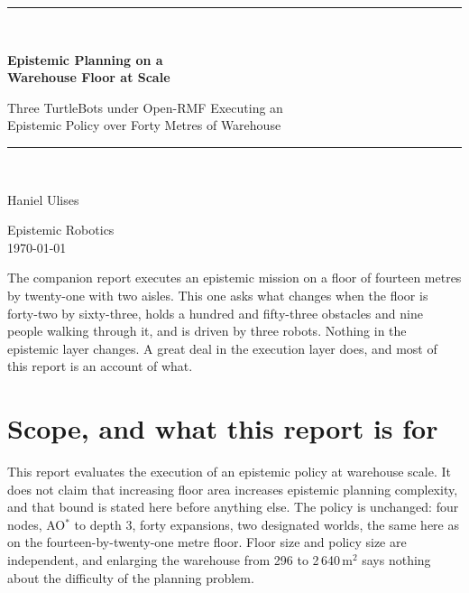 \documentclass[11pt,a4paper]{article}
\theoremstyle{definition}
\begin{document}
\begin{titlepage}
\centering
\vspace*{2.4cm}
{\color{rulegrey}\rule{\textwidth}{0.8pt}}\\[0.9cm]
{\LARGE\bfseries Epistemic Planning on a\\ Warehouse Floor at Scale\par}
\vspace{0.5cm}
{\large\color{slate} Three TurtleBots under Open-RMF Executing an\\ Epistemic Policy over Forty Metres of Warehouse\par}
\vspace{0.7cm}
{\color{rulegrey}\rule{\textwidth}{0.8pt}}\\[1.4cm]

{\large Haniel Ulises\par}
\vspace{0.3cm}
{\color{slate} Epistemic Robotics}\\
\vspace{0.15cm}
{\color{slate}\today}

\vfill
{\color{slate}\small
The companion report executes an epistemic mission on a floor of fourteen
metres by twenty-one with two aisles. This one asks what changes when the floor
is forty-two by sixty-three, holds a hundred and fifty-three obstacles and nine
people walking through it, and is driven by three robots.
Nothing in the epistemic layer changes. A great deal in the execution layer does, and most of this report is an account of what.}
\vspace{1.2cm}
\end{titlepage}

\tableofcontents
\newpage

\section{Scope, and what this report is for}

This report evaluates the execution of an epistemic policy at warehouse scale.
It does not claim that increasing floor area increases epistemic planning
complexity, and that bound is stated here before anything else. The policy is
unchanged: four nodes, AO$^*$ to depth 3, forty expansions, two designated
worlds, the same here as on the fourteen-by-twenty-one metre floor. Floor size
and policy size are independent, and enlarging the warehouse from 296 to
2\,640\,m$^2$ says nothing about the difficulty of the planning problem.
\end{document}
